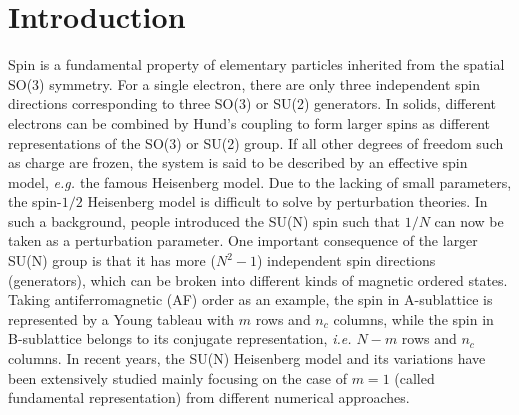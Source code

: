 \documentclass[aps,twocolumn,superscriptaddress]{revtex4-1}
\newcommand{\ie}{\textit{i.e.{ }}}
\newcommand{\eg}{\textit{e.g.{ }}}
\begin{document}
\section{Introduction}
Spin is a fundamental property of elementary particles inherited from the spatial SO(3) symmetry. For a single electron,
there are only three independent spin directions corresponding to three SO(3) or SU(2) generators. In solids, different
electrons can be combined by Hund's coupling to form larger spins as different representations of the SO(3) or SU(2)
group. If all other degrees of freedom such as charge are frozen, the system is said to be described by an effective
spin model, \eg the famous Heisenberg model. Due to the lacking of small parameters, the spin-$1/2$ Heisenberg model is
difficult to solve by perturbation theories. In such a background, people introduced the SU(N) spin such that $1/N$ can
now be taken as a perturbation parameter.
\cite{affleck1985,affleck1988,*marston1989,arovas1988,read1989,*read1989a,*read1990} One important consequence of the
larger SU(N) group is that it has more ($N^2-1$) independent spin directions (generators), which can be broken into
different kinds of magnetic ordered states. Taking antiferromagnetic (AF) order as an example, the spin in A-sublattice
is represented by a Young tableau with $m$ rows and $n_c$ columns, while the spin in B-sublattice belongs to its
conjugate representation, \ie $N-m$ rows and $n_c$ columns. In recent years, the SU(N) Heisenberg model and its
variations have been extensively studied mainly focusing on the case of $m=1$ (called fundamental representation) from
different numerical approaches.
\cite{harada2003,buchta2007,kawashima2007,arovas2008,beach2009,lou2009,rachel2009,kaul2012,harada2013,nataf2014,okubo2015,suzuki2015,nataf2016}
\end{document}
